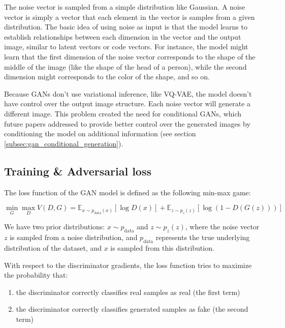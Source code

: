 The noise vector is sampled from a simple distribution like Gaussian. A noise vector is simply a vector that each element in the vector is samples from a given distribution. The basic idea of using noise as input is that the model learns to establish relationships between each dimension in the vector and the output image, similar to latent vectors or code vectors. For instance, the model might learn that the first dimension of the noise vector corresponds to the shape of the middle of the image (like the shape of the head of a person), while the second dimension might corresponds to the color of the shape, and so on.

Because GANs don't use variational inference, like VQ-VAE, the model doesn't have control over the output image structure. Each noise vector will generate a different image. This problem created the need for conditional GANs, which future papers addressed to provide better control over the generated images by conditioning the model on additional information (see section \ref{subsec:gan_conditional_generation}).




\subsection{Training \& Adversarial loss}
\label{subsec:gan_training}

The loss function of the GAN model is defined as the following min-max game:

\begin{equation}
    \label{eq:gan_loss}
    \min_G \max_D V(D,G) = \mathbb{E}_{x \sim p_{\text{data}}(x)}[\log D(x)] + \mathbb{E}_{z \sim p_z(z)}[\log(1 - D(G(z)))]
\end{equation}

We have two prior distributions: $x \sim p_{\text{data}}$ and $z \sim p_z(z)$, where the noise vector $z$ is sampled from a noise distribution, and $p_{\text{data}}$ represents the true underlying distribution of the dataset, and $x$ is sampled from this distribution.

With respect to the discriminator gradients, the loss function tries to maximize the probability that:

\begin{enumerate}
    \item the discriminator correctly classifies real samples as real (the first term)
    \item the discriminator correctly classifies generated samples as fake (the second term)
\end{enumerate}


